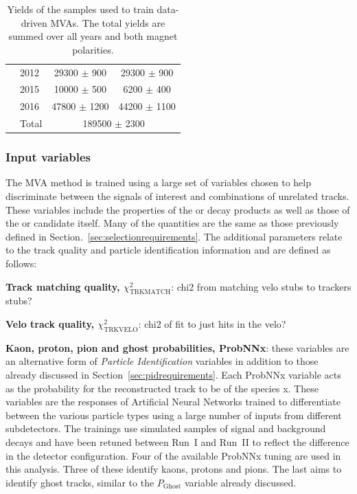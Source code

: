 \begin{table}[!h]
\begin{center}
\begin{tabular}{llcc}
                                    & 2012   & 29300 $\pm$ 900    & 29300 $\pm$ 900 \\
                                    & 2015   & 10000 $\pm$ 500    & 6200  $\pm$ 400 \\
                                    & 2016   & 47800 $\pm$ 1200   & 44200 $\pm$ 1100 \\
                                    & Total  & \multicolumn{2}{c}{189500 $\pm$ 2300}\\
         \hline
      \end{tabular}
      \caption{Yields of the samples used to train data-driven MVAs. The total yields are summed over all years and both magnet polarities.}
      \label{table:mva_training_yields}
   \end{center}
\end{table}

\subsubsection{Input variables}


The MVA method is trained using a large set of variables chosen to help discriminate between the signals of interest and combinations of unrelated tracks. These variables include the properties of the \Kpm or \pipm decay products as well as those of the \phiz or \Dsp candidate itself. Many of the quantities are the same as those previously defined in Section.~\ref{sec:selectionrequirements}. The additional parameters relate to the track quality and particle identification information and are defined as follows:

\begin{description}
\item \textbf{Track matching quality, $\chi^{2}_{\text{TRKMATCH}}$}: {\color{Red} chi2 from matching velo stubs to trackers stubs?}
\item \textbf{Velo track quality, $\chi^{2}_{\text{TRKVELO}}$}: {\color{Red} chi2 of fit to just hits in the velo?}
\item \textbf{Kaon, proton, pion and ghost probabilities, ProbNNx}: these variables are an alternative form of \emph{Particle Identification} variables in addition to those already discussed in Section~\ref{sec:pidrequirements}. Each ProbNNx variable acts as the probability for the reconstructed track to be of the species x. These variables are the responses of Artificial Neural Networks trained to differentiate between the various particle types using a large number of inputs from different subdetectors. The trainings use simulated samples of signal and background decays and have been retuned between Run~I and Run~II to reflect the difference in the detector configuration. Four of the available ProbNNx tuning are used in this analysis. Three of these identify kaons, protons and pions. The last aims to identify ghost tracks, similar to the $P_{\text{Ghost}}$ variable already discussed. 
\end{description}

